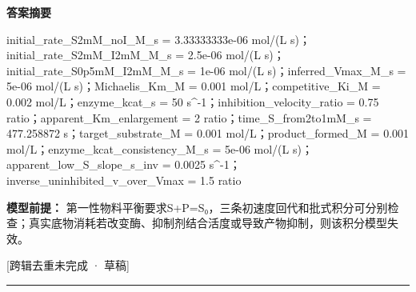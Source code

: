 \documentclass[UTF8,11pt,a4paper]{ctexart}
\begin{document}
\noindent\textbf{答案摘要}\par
initial\_rate\_S2mM\_noI\_M\_s = 3.33333333e-06 mol/(L s)；initial\_rate\_S2mM\_I2mM\_M\_s = 2.5e-06 mol/(L s)；initial\_rate\_S0p5mM\_I2mM\_M\_s = 1e-06 mol/(L s)；inferred\_Vmax\_M\_s = 5e-06 mol/(L s)；Michaelis\_Km\_M = 0.001 mol/L；competitive\_Ki\_M = 0.002 mol/L；enzyme\_kcat\_s = 50 s\textasciicircum{}-1；inhibition\_velocity\_ratio = 0.75 ratio；apparent\_Km\_enlargement = 2 ratio；time\_S\_from2to1mM\_s = 477.258872 s；target\_substrate\_M = 0.001 mol/L；product\_formed\_M = 0.001 mol/L；enzyme\_kcat\_consistency\_M\_s = 5e-06 mol/(L s)；apparent\_low\_S\_slope\_s\_inv = 0.0025 s\textasciicircum{}-1；inverse\_uninhibited\_v\_over\_Vmax = 1.5 ratio\par
\noindent\textbf{模型前提：}
第一性物料平衡要求S+P=S₀，三条初速度回代和批式积分可分别检查；真实底物消耗若改变酶、抑制剂结合活度或导致产物抑制，则该积分模型失效。\par
\noindent\textcolor{red!65!black}{[跨辑去重未完成 · 草稿]} \par
\medskip\hrule\medskip
{}
\end{document}
